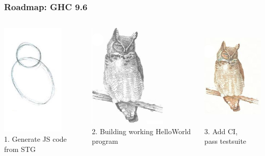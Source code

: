 \documentclass{beamer}
\begin{document}
\begin{frame}
\frametitle{Roadmap: GHC 9.6}
\begin{columns}

\begin{column}{0.3\textwidth}
\begin{center}
\includegraphics[height=5.4cm]{images/owl0.png}\\
1. Generate JS code from STG
\end{center}
\end{column}

\begin{column}{0.3\textwidth}
\begin{center}
\includegraphics[height=5cm]{images/owl1.png}\\
2. Building working HelloWorld program
\end{center}
\end{column}

\begin{column}{0.3\textwidth}
\begin{center}
\includegraphics[height=5cm]{images/owl2.png}\\
3. Add CI,\\pass testsuite
\end{center}
\end{column}

\end{columns}
\end{frame}
\end{document}
